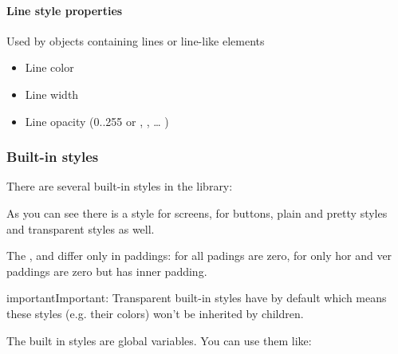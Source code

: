 \documentclass[letterpaper,10pt,english]{sphinxmanual}
\begin{document}
\paragraph{Line style properties}
\label{\detokenize{overview/styles:line-style-properties}}
Used by objects containing lines or line-like elements
\begin{itemize}
\item {} 
 Line color

\item {} 
 Line width

\item {} 
 Line opacity (0..255 or , ,  … )

\end{itemize}


\subsubsection{Built-in styles}
\label{\detokenize{overview/styles:built-in-styles}}
There are several built-in styles in the library:


As you can see there is a style for screens, for buttons, plain and pretty styles and transparent styles as well.

The ,  and  differ only in paddings: for  all padings are zero, for  only hor and ver paddings are zero but has inner padding.

\begin{sphinxadmonition}{important}{Important:}
Transparent built-in styles have  by default which means these styles (e.g. their colors) won’t be inherited by children.
\end{sphinxadmonition}

The built in styles are global  variables. You can use them like:

\begin{sphinxVerbatim}[commandchars=\\\{\}]
  
\end{sphinxVerbatim}
\end{document}
